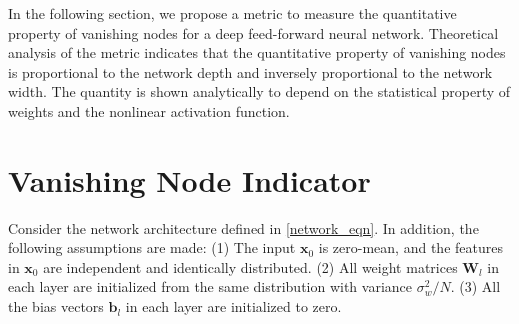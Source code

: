 In the following section, we propose a metric to measure the quantitative property of vanishing nodes for a deep feed-forward neural network.
Theoretical analysis of the metric indicates that the quantitative property of vanishing nodes is proportional to the network depth and inversely proportional to the network width.
The quantity is shown analytically to depend on the statistical property of weights and the nonlinear activation function. 


\section{Vanishing Node Indicator} \label{initial}

Consider the network architecture defined in \eqref{network_eqn}. In addition, the following assumptions are
made: (1) The input $\mathbf{x}_0$ is zero-mean, and the features in $\mathbf{x}_0$ are independent and
identically distributed. (2) All weight matrices $\mathbf{W}_l$ in each layer are initialized from the same
distribution with variance $\sigma_w^2/N$. (3) All the bias vectors $\mathbf{b}_l$ in each layer are
initialized to zero.


